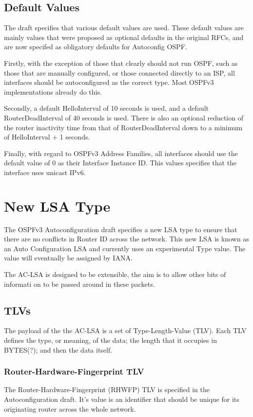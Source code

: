 \documentclass[12pt]{report}
\begin{document}
\subsection{Default Values}
The draft specifies that various default values are used. These default values are 
mainly values that were proposed as optional defaults in the original RFCs, and are 
now specifed as obligatory defaults for Autoconfig OSPF. 

Firstly, with the exception of those that clearly should not run OSPF, such as those 
that are manually configured, or those connected directly to an ISP, all interfaces 
should be autoconfigured as the correct type. Most OSPFv3 implementations already do 
this. 

Secondly, a default HelloInterval of 10 seconds is used, and a default 
RouterDeadInterval of 40 seconds is used. There is also an optional reduction of the 
router inactivity time from that of RouterDeadInterval down to a minimum of 
HelloInterval + 1 seconds. 

Finally, with regard to OSPFv3 Address Families, all interfaces should use the 
default value of 0 as their Interface Instance ID. This values specifies that the 
interface uses unicast IPv6.  

\section{New LSA Type}
The OSPFv3 Autoconfiguration draft specifies a new LSA type to ensure that there are 
no conflicts in Router ID across the network. This new LSA is known as an Auto 
Configuration LSA and currently uses an experimental Type value. The value will 
eventually be assigned by IANA. 

The AC-LSA is designed to be extensible, the aim is to allow other bits of informati
on to be passed around in these packets. 

\subsection{TLVs}
The payload of the the AC-LSA is a set of Type-Length-Value (TLV). Each TLV defines 
the type, or meaning, of the data; the length that it occupies in BYTES(?); and then 
the data itself. 

\subsubsection{Router-Hardware-Fingerprint TLV}
The Router-Hardware-Fingerprint (RHWFP) TLV is specified in the Autoconfiguration 
draft. It's value is  an identifier that should be unique for its originating router across the whole network. 
\end{document}
